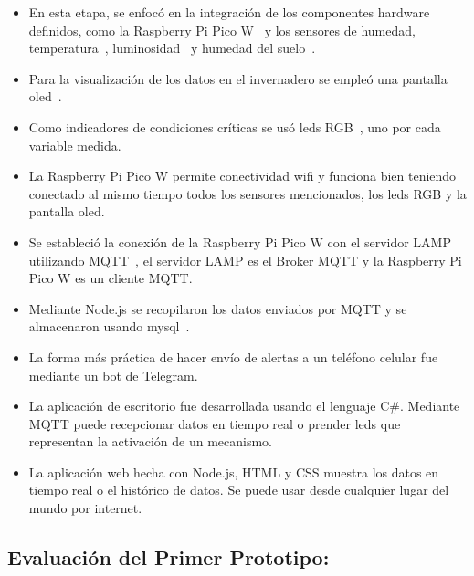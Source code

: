 \begin{itemize}
	\item En esta etapa, se enfocó en la integración de los componentes hardware definidos, como la Raspberry Pi Pico W~\cite{misc:RPiPicoW} y los sensores de humedad, temperatura~\cite{manual:DHT22}, luminosidad~\cite{manual:BH1750} y humedad del suelo~\cite{wiki:SensorHumedadSuelo}.

	\item Para la visualización de los datos en el invernadero se empleó una pantalla oled~\cite{manual:Oled}.

	\item Como indicadores de condiciones críticas se usó leds RGB~\cite{manual:LedRGB}, uno por cada variable medida.

	\item La Raspberry Pi Pico W permite conectividad wifi y funciona bien teniendo conectado al mismo tiempo todos los sensores mencionados, los leds RGB y la pantalla oled.

	\item Se estableció la conexión de la Raspberry Pi Pico W con el servidor LAMP utilizando MQTT~\cite{manual:MQTT}, el servidor LAMP es el Broker MQTT y la Raspberry Pi Pico W es un cliente MQTT.

	\item Mediante Node.js se recopilaron los datos enviados por MQTT y se almacenaron usando mysql~\cite{misc:Mysql}.

	\item La forma más práctica de hacer envío de alertas a un teléfono celular fue mediante un bot de Telegram.

	\item La aplicación de escritorio fue desarrollada usando el lenguaje C\#. Mediante MQTT puede recepcionar datos en tiempo real o prender leds que representan la activación de un mecanismo.

	\item La aplicación web hecha con Node.js, HTML y CSS muestra los datos en tiempo real o el histórico de datos. Se puede usar desde cualquier lugar del mundo por internet.
\end{itemize}

\subsection{Evaluación del Primer Prototipo:}

